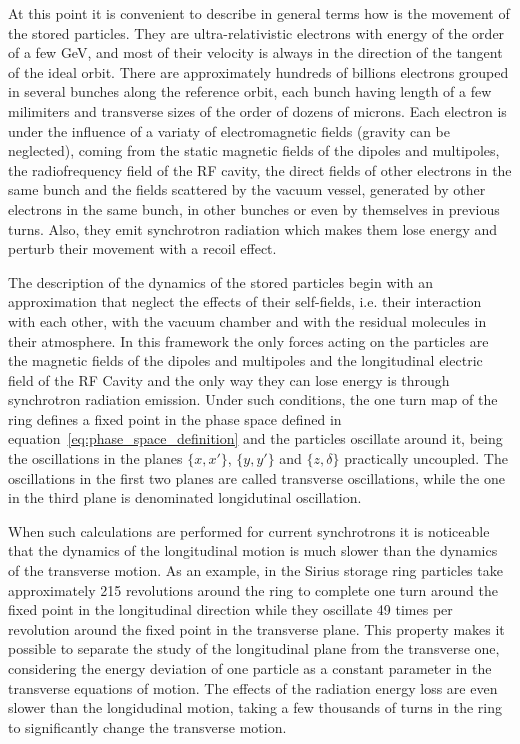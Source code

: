     At this point it is convenient to describe in general terms how is the movement of the stored particles. They are ultra-relativistic electrons with energy of the order of a few \si{GeV}, and most of their velocity is always in the direction of the tangent of the ideal orbit. There are approximately hundreds of billions electrons grouped in several bunches along the reference orbit, each bunch having length of a few milimiters and transverse sizes of the order of dozens of microns. Each electron is under the influence of a variaty of electromagnetic fields (gravity can be neglected), coming from the static magnetic fields of the dipoles and multipoles, the radiofrequency field of the RF cavity, the direct fields of other electrons in the same bunch and the fields scattered by the vacuum vessel, generated by other electrons in the same bunch, in other bunches or even by themselves in previous turns. Also, they emit synchrotron radiation which makes them lose energy and perturb their movement with a recoil effect.

    The description of the dynamics of the stored particles begin with an approximation that neglect the effects of their self-fields, i.e. their interaction with each other, with the vacuum chamber and with the residual molecules in their atmosphere. In this framework the only forces acting on the particles are the magnetic fields of the dipoles and multipoles and the longitudinal electric field of the RF Cavity and the only way they can lose energy is through synchrotron radiation emission. Under such conditions, the one turn map of the ring defines a fixed point in the phase space defined in equation~\eqref{eq:phase_space_definition} and the particles oscillate around it, being the oscillations in the planes $\{x,x'\}$, $\{y,y'\}$ and $\{z,\delta\}$ practically uncoupled. The oscillations in the first two planes are called transverse oscillations, while the one in the third plane is denominated longidutinal oscillation.

    When such calculations are performed for current synchrotrons it is noticeable that the dynamics of the longitudinal motion is much slower than the dynamics of the transverse motion. As an example, in the Sirius storage ring particles take approximately 215 revolutions around the ring to complete one turn around the fixed point in the longitudinal direction while they oscillate 49 times per revolution around the fixed point in the transverse plane. This property makes it possible to separate the study of the longitudinal plane from the transverse one, considering the energy deviation of one particle as a constant parameter in the transverse equations of motion. The effects of the radiation energy loss are even slower than the longidudinal motion, taking a few thousands of turns in the ring to significantly change the transverse motion.

